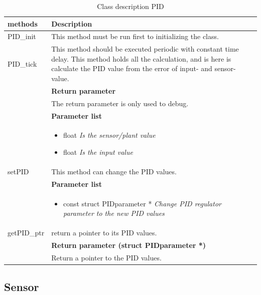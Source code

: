 \begin{table}[H]
	\centering
	\begin{tabular}{|p{5 cm}|p{10 cm}|}
		\hline
		\textbf{methods} & \textbf{Description} \\ \hline
		
		PID\_init
		& This method must be run first to initializing the class. 
		\\ \hline
		
		PID\_tick
		& This method should be executed periodic with constant time delay. This method holds all the calculation, and is here is calculate the PID value from the error of input- and sensor- value.
		\\ & \textbf{Return parameter}
		\\ & The return parameter is only used to debug.
		\\ & \textbf{Parameter list}
		\\ & \begin{itemize}
			\item {\large float}
			\subitem \textit{Is the sensor/plant value}
			\item {\large float}
			\subitem \textit{Is the input value}
		\end{itemize}
		\\ \hline
		
		setPID
		& This method can change the PID values.
		\\ & \textbf{Parameter list}
		\\ & \begin{itemize}
			\item {\large const struct PIDparameter *}
			\subitem \textit{Change PID regulator parameter to the new PID values}
		\end{itemize} 
		\\ \hline
		
		getPID\_ptr
		& return a pointer to its PID values.
		\\ & \textbf{Return parameter (struct PIDparameter *)}
		\\ & Return a pointer to the PID values. 
		\\ \hline
		
	\end{tabular}
	\caption{Class description PID}
	\label{table:Class_description_PID_RR_PSoC}
\end{table}

\subsection{Sensor}

